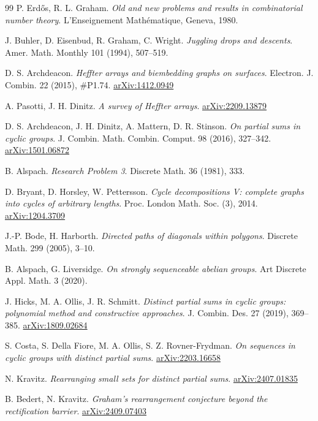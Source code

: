 \begin{thebibliography}{99}
 P. Erd\H{o}s, R. L. Graham. \emph{Old and new problems and results in combinatorial number theory}. L'Enseignement Math\'ematique, Geneva, 1980.

 J. Buhler, D. Eisenbud, R. Graham, C. Wright. \emph{Juggling drops and descents}. Amer. Math. Monthly 101 (1994), 507--519.

 D. S. Archdeacon. \emph{Heffter arrays and biembedding graphs on surfaces}. Electron. J. Combin. 22 (2015), \#P1.74. \href{https://arxiv.org/abs/1412.0949}{arXiv:1412.0949}

 A. Pasotti, J. H. Dinitz. \emph{A survey of Heffter arrays}. \href{https://arxiv.org/abs/2209.13879}{arXiv:2209.13879}

 D. S. Archdeacon, J. H. Dinitz, A. Mattern, D. R. Stinson. \emph{On partial sums in cyclic groups}. J. Combin. Math. Combin. Comput. 98 (2016), 327--342. \href{https://arxiv.org/abs/1501.06872}{arXiv:1501.06872}

 B. Alspach. \emph{Research Problem 3}. Discrete Math. 36 (1981), 333.

 D. Bryant, D. Horsley, W. Pettersson. \emph{Cycle decompositions V: complete graphs into cycles of arbitrary lengths}. Proc. London Math. Soc. (3), 2014. \href{https://arxiv.org/abs/1204.3709}{arXiv:1204.3709}

 J.-P. Bode, H. Harborth. \emph{Directed paths of diagonals within polygons}. Discrete Math. 299 (2005), 3--10.

 B. Alspach, G. Liversidge. \emph{On strongly sequenceable abelian groups}. Art Discrete Appl. Math. 3 (2020).

 J. Hicks, M. A. Ollis, J. R. Schmitt. \emph{Distinct partial sums in cyclic groups: polynomial method and constructive approaches}. J. Combin. Des. 27 (2019), 369--385. \href{https://arxiv.org/abs/1809.02684}{arXiv:1809.02684}

 S. Costa, S. Della Fiore, M. A. Ollis, S. Z. Rovner-Frydman. \emph{On sequences in cyclic groups with distinct partial sums}. \href{https://arxiv.org/abs/2203.16658}{arXiv:2203.16658}

 N. Kravitz. \emph{Rearranging small sets for distinct partial sums}. \href{https://arxiv.org/abs/2407.01835}{arXiv:2407.01835}

 B. Bedert, N. Kravitz. \emph{Graham's rearrangement conjecture beyond the rectification barrier}. \href{https://arxiv.org/abs/2409.07403}{arXiv:2409.07403}


\end{thebibliography}
